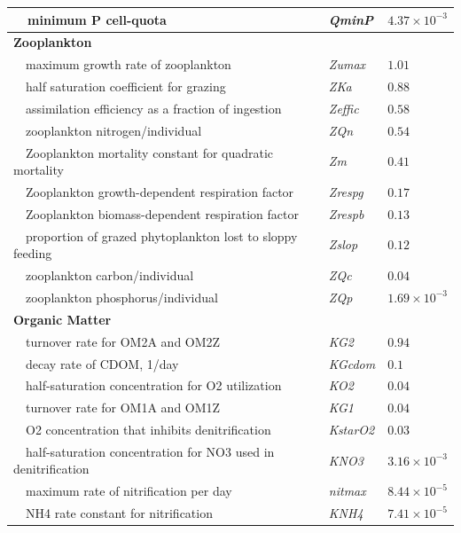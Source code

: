 \documentclass[letterpaper,12pt,oneside]{article}\usepackage[]{graphicx}\usepackage[]{color}
\begin{document}
\begin{table}[!tbp]
{\begin{center}
\begin{tabular}{lll}
~~minimum P cell-quota&\textit{QminP}&$4.37\times 10^{-3}$\tabularnewline
\hline
{\bfseries Zooplankton}&&\tabularnewline
~~maximum growth rate of zooplankton&\textit{Zumax}&$1.01$\tabularnewline
~~half saturation coefficient for grazing&\textit{ZKa}&$0.88$\tabularnewline
~~assimilation efficiency as a fraction of ingestion&\textit{Zeffic}&$0.58$\tabularnewline
~~zooplankton nitrogen/individual&\textit{ZQn}&$0.54$\tabularnewline
~~Zooplankton mortality constant for quadratic mortality&\textit{Zm}&$0.41$\tabularnewline
~~Zooplankton growth-dependent respiration factor&\textit{Zrespg}&$0.17$\tabularnewline
~~Zooplankton biomass-dependent respiration factor&\textit{Zrespb}&$0.13$\tabularnewline
~~proportion of grazed phytoplankton lost to sloppy feeding&\textit{Zslop}&$0.12$\tabularnewline
~~zooplankton carbon/individual&\textit{ZQc}&$0.04$\tabularnewline
~~zooplankton phosphorus/individual&\textit{ZQp}&$1.69\times 10^{-3}$\tabularnewline
\hline
{\bfseries Organic Matter}&&\tabularnewline
~~turnover rate for OM2A and OM2Z&\textit{KG2}&$0.94$\tabularnewline
~~decay rate of CDOM, 1/day&\textit{KGcdom}&$0.1$\tabularnewline
~~half-saturation concentration for O2 utilization&\textit{KO2}&$0.04$\tabularnewline
~~turnover rate for OM1A and OM1Z&\textit{KG1}&$0.04$\tabularnewline
~~O2 concentration that inhibits denitrification&\textit{KstarO2}&$0.03$\tabularnewline
~~half-saturation concentration for NO3 used in denitrification&\textit{KNO3}&$3.16\times 10^{-3}$\tabularnewline
~~maximum rate of nitrification per day&\textit{nitmax}&$8.44\times 10^{-5}$\tabularnewline
~~NH4 rate constant for nitrification&\textit{KNH4}&$7.41\times 10^{-5}$\tabularnewline
\hline
\end{tabular}\end{center}}

\end{table}
\end{document}

